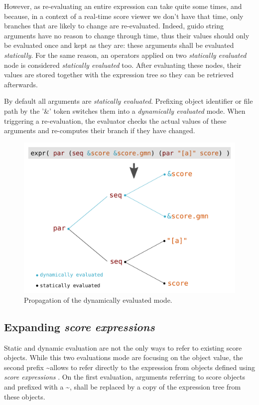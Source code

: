 \documentclass{article}
\newcommand{\sExpr}{\emph{score expressions} }
\newcommand{\lowTilde} 		{\textasciitilde}
\begin{document}
However, as re-evaluating an entire expression can take quite some times, and because, in a context of a real-time score viewer we don't have that time, only branches that are likely to change are re-evaluated. Indeed, guido string arguments have no reason to change through time, thus their values should only be evaluated once and kept as they are: these arguments shall be evaluated \emph{statically}. For the same reason, an operators applied on two \emph{statically evaluated} node is considered \emph{statically evaluated} too. After evaluating these nodes, their values are stored together with the expression tree so they can be retrieved afterwards.

By default all arguments are \emph{statically evaluated}. Prefixing object identifier or file path by the '\&' token switches them into a \emph{dynamically evaluated} mode. When triggering a re-evaluation, the evaluator checks the actual values of these arguments and re-computes their branch if they have changed.


\begin{figure}[th]
\centering
\includegraphics[width=1\columnwidth]{imgs/dynamicEval}
\caption{Propagation of the dynamically evaluated mode.
\label{fig:example}}
\end{figure}


\subsection{Expanding \sExpr}

Static and dynamic evaluation are not the only ways to refer to existing score objects. While this two evaluations mode are focusing on the object value, the second prefix \lowTilde allows to refer directly to the expression from objects defined using \sExpr. On the first evaluation, arguments referring to score objects and prefixed with a \lowTilde, shall be replaced by a copy of the expression tree from these objects.
\end{document}
